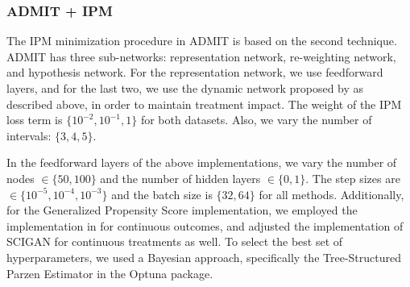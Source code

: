 \documentclass[letterpaper]{article} %
\begin{document}
\subsubsection{ADMIT + IPM}
The IPM minimization procedure in ADMIT is based on the second technique. ADMIT has three sub-networks: representation network, re-weighting network, and hypothesis network. For the representation network, we use feedforward layers, and for the last two, we use the dynamic network proposed by \cite{nie2021vcnet} as described above, in order to maintain treatment impact. The weight of the IPM loss term is $\{10^{-2}, 10^{-1}, 1\}$ for both datasets. Also, we vary the number of intervals: $\{3, 4, 5\}$.

In the feedforward layers of the above implementations, we vary the number of nodes $\in \{50, 100\}$ and the number of hidden layers $\in \{0, 1\}$. The step sizes are $\in \{10^{-5}, 10^{-4}, 10^{-3}\}$ and the batch size is $\{32, 64\}$ for all methods. Additionally, for the Generalized Propensity Score implementation, we employed the implementation in \cite{Kobrosly2020} for continuous outcomes, and adjusted the implementation of SCIGAN \cite{bica2020estimating} for continuous treatments as well. To select the best set of hyperparameters, we used a Bayesian approach, specifically the Tree-Structured Parzen Estimator in the Optuna package.
\end{document}
